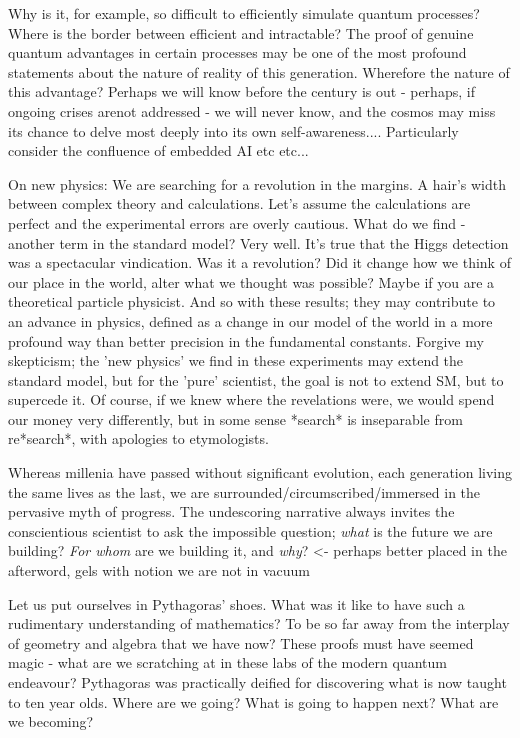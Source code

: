 Why is it,
	for example, so difficult to efficiently simulate quantum processes?
	Where is the border between efficient and intractable? The proof of
	genuine quantum advantages in certain processes may be one of the most
	profound statements about the nature of reality of this generation.
	Wherefore the nature of this advantage? Perhaps we will know before the
	century is out - perhaps, if ongoing crises arenot addressed - we will
	never know, and the cosmos may miss its chance to delve most deeply into
	its own self-awareness.... Particularly consider the confluence of embedded AI etc etc...


			On new physics: We are searching for a revolution in the margins.
	A hair's width between complex theory and calculations.
	Let's assume the calculations are perfect and the experimental errors are overly cautious.
	What do we find - another term in the standard model? Very well.
	It's true that the Higgs detection was a spectacular vindication.
	Was it a revolution? Did it change how we think of our place in the world, alter what we thought was possible? Maybe if you are a theoretical particle physicist.
	And so with these results; they may contribute to an advance in physics, defined as a change in our model of the world in a more profound way than better precision in the fundamental constants.
	Forgive my skepticism; the 'new physics' we find in these experiments may extend the standard model, but for the 'pure' scientist, the goal is not to extend SM, but to supercede it.
	Of course, if we knew where the revelations were, we would spend our money very differently, but in some sense *search* is inseparable from re*search*, with apologies to etymologists.


Whereas millenia have passed without significant evolution, each generation living the same lives as the last, we are surrounded/circumscribed/immersed in the pervasive myth of progress.
	The undescoring narrative always invites the conscientious scientist to ask the impossible question; \emph{what} is the future we are building? \emph{For whom} are we building it, and \emph{why}? <- perhaps better placed in the afterword, gels with notion we are not in vacuum
	

Let us put ourselves in Pythagoras' shoes. What was it like to have such a rudimentary understanding of mathematics? To be so far away from the interplay of geometry and algebra that we have now? These proofs must have seemed magic - what are we scratching at in these labs of the modern quantum endeavour? Pythagoras was practically deified for discovering what is now taught to ten year olds. Where are we going? What is going to happen next? What are we becoming?

